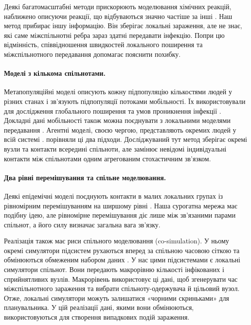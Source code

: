 Деякі багатомасштабні методи прискорюють моделювання хімічних реакцій, наближено описуючи реакції, що відбуваються значно частіше за інші \citep{haseltine2002,cao2005slow}. Наш метод прибирає іншу інформацію. Він зберігає локальні зараження, але не знає, які саме міжспільнотні ребра зараз здатні передавати інфекцію. Попри цю відмінність, співвідношення швидкостей локального поширення та міжспільнотного передавання допомагає пояснити похибку.

\paragraph{Моделі з кількома спільнотами.}
Метапопуляційні моделі описують кожну підпопуляцію кількостями людей у різних станах і зв'язують підпопуляції потоками мобільності. Їх використовували для дослідження глобального поширення та умов проникнення інфекції \citep{colizza2007reaction,colizza2008,balcan2009,balcan2010modeling}. Докладні дані мобільності також можна поєднувати з локальними моделями передавання \citep{chang2021}. Агентні моделі, своєю чергою, представляють окремих людей у всій системі \citep{eubank2004,kerr2021}. \citet{ajelli2010} порівняли ці два підходи. Досліджуваний тут метод зберігає окремі вузли та контакти всередині спільноти, але замінює невідомі індивідуальні контакти між спільнотами одним агрегованим стохастичним зв'язком.

\paragraph{Два рівні перемішування та спільне моделювання.}
Деякі епідемічні моделі поєднують контакти в малих локальних групах із рівномірним перемішуванням на ширшому рівні \citep{ball1997}. Наша сурогатна мережа має подібну ідею, але рівномірне перемішування діє лише між зв'язаними парами спільнот, а його силу визначає загальна вага зв'язку.

Реалізація також має риси спільного моделювання (co-simulation). У ньому окремі симулятори підсистем рухаються вперед за спільною часовою сіткою та обмінюються обмеженим набором даних \citep{gomes2018cosim}. У нас цими підсистемами є локальні симулятори спільнот. Вони передають макрорівню кількості інфікованих і сприйнятливих вузлів. Макрорівень використовує ці дані, щоб згенерувати час міжспільнотного зараження та вибрати спільноту-одержувача й цільовий вузол. Отже, локальні симулятори можуть залишатися «чорними скриньками» для планувальника. У цій реалізації дані, якими вони обмінюються, використовуються для створення випадкових подій зараження.

